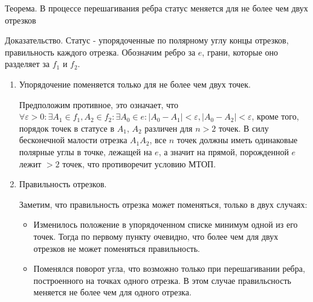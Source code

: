 \documentclass[letterpaper,12pt]{article}
\begin{document}
\hspace{4em}

\begin{center}
      Теорема. В процессе перешагивания ребра статус меняется для не более чем 
      двух отрезков
\end{center}
Доказательство.
Статус - упорядоченные по полярному углу концы отрезков, 
правильность каждого отрезка. Обозначим ребро за $e$, грани, которые оно 
разделяет за $f_1$ и $f_2$.
\begin{enumerate}
      \item Упорядочение поменяется только для не более чем двух точек.
 
            Предположим противное, это означает, что
            $\forall \varepsilon > 0 : \exists A_1 \in f_1, A_2 \in f_2 : 
            \exists A_0 \in e  :  |A_0 - A_1|  < \varepsilon, 
            |A_0 - A_2|  < \varepsilon$,
            кроме того, порядок точек в статусе в $A_1$, $A_2$ различен 
            для $n > 2$ точек. В силу бесконечной малости отрезка $A_1 A_2$,
            все $n$ точек должны иметь одинаковые полярные углы в точке,
            лежащей на $e$, а значит на прямой, порожденной $e$ лежит $>2$
            точек, что противоречит условию МТОП.
      \item Правильность отрезков.
 
            Заметим, что правильность отрезка может поменяться,
            только в двух случаях:
            \begin{itemize}
                  \item Изменилось положение в упорядоченном списке
                        минимум одной из его точек. Тогда по первому
                        пункту очевидно, что более чем для двух отрезков
                        не может поменяться правильность.
                  \item Поменялся поворот угла, что возможно только 
                        при перешагивании ребра, построенного на точках 
                        одного отрезка. В этом случае правильсность
                        меняется не более чем для одного отрезка.
            \end{itemize}
\end{enumerate}
\end{document}
